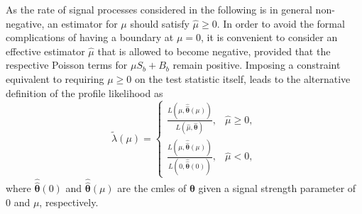 As the rate of signal processes considered in the following is in general non-negative, an estimator for $\mu$ should satisfy $\hat{\mu}\geq 0$. In order to avoid the formal complications of having a boundary at $\mu = 0$, it is convenient to consider an effective estimator $\hat{\mu}$ that is allowed to become negative, provided that the respective Poisson terms for $\mu S_b + B_b$ remain positive. Imposing a constraint equivalent to requiring $\mu \geq 0$ on the test statistic itself, leads to the alternative definition of the profile likelihood as
\begin{equation}
	\tilde{\lambda}(\mu)= 
\begin{cases}
     \frac{L(\mu,\boldsymbol{\hat{\hat{\theta}}}(\mu))}{L(\hat{\mu},\hat{\boldsymbol{\theta}})}, & \hat{\mu} \geq 0,\\
     \frac{L(\mu,\boldsymbol{\hat{\hat{\theta}}}(\mu))}{L(0,\boldsymbol{\hat{\hat{\theta}}}(0))},              & \hat{\mu} < 0,
\end{cases}
\label{eq:lambda_tilde}
\end{equation}
where $\boldsymbol{\hat{\hat{\theta}}}(0)$ and $\boldsymbol{\hat{\hat{\theta}}}(\mu)$ are the \glspl{cmle} of $\boldsymbol{\theta}$ given a signal strength parameter of 0 and $\mu$, respectively. 

